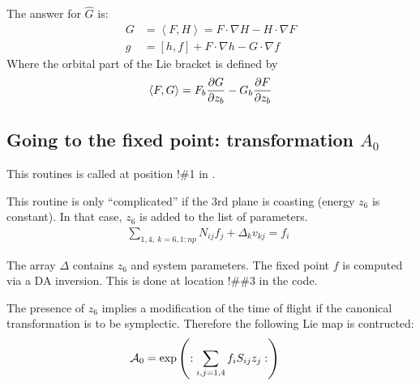 \documentclass{hitec}     %
\begin{document}
{{{{{{The answer for $\widehat{G}$ is: 
%
\begin{align} G&= \left\langle{F,H}\right\rangle=
F\cdot \nabla H-H\cdot \nabla F\nonumber \\
 g&=\left[{h,f}\right]+F\cdot \nabla h-G\cdot \nabla f \label{liebra}\end{align}
Where the orbital part of the Lie bracket is defined by
%
\begin{align} \left\langle{F,G}\right\rangle=
{F}_{b}{\partial G \over \partial {z}_{b}}-{G}_{b}{\partial F \over \partial {z}_{b}} \label{eq:liebrac}\end{align}

%
\subsection{Going to the fixed point: transformation   $A_0$}\label{s:cgofix}

This routines is called at position !\#1 in .


This routine is only ``complicated'' if the 3rd plane is coasting (energy $z_6$ is constant).  In that case, $z_6$ is added to the list of parameters. 
%
\begin{align} \sum\limits_{1,4,\ k=
6,1:np}^{} {N}_{ij}{f}_{j}+{\Delta }_{k}{v}_{kj}=
{f}_{i}\ \ \label{etaform1} \end{align}

The array $\Delta$ contains $z_6$ and  system parameters. The fixed point $f$ is computed via a DA inversion. This is done at location !\#\#3 in the code.

The presence of $z_6$ implies a modification of the time of flight if the canonical transformation is to be symplectic.  Therefore the following Lie map is contructed:
%
\begin{align} {{\cal A}}_{0}&=\exp\left({:\sum\limits_{i,j=1,4}^{} {f}_{i}{S}_{ij}{z}_{j}:}\right)\label{tlie}\end{align}

}}}}}}
\end{document}
